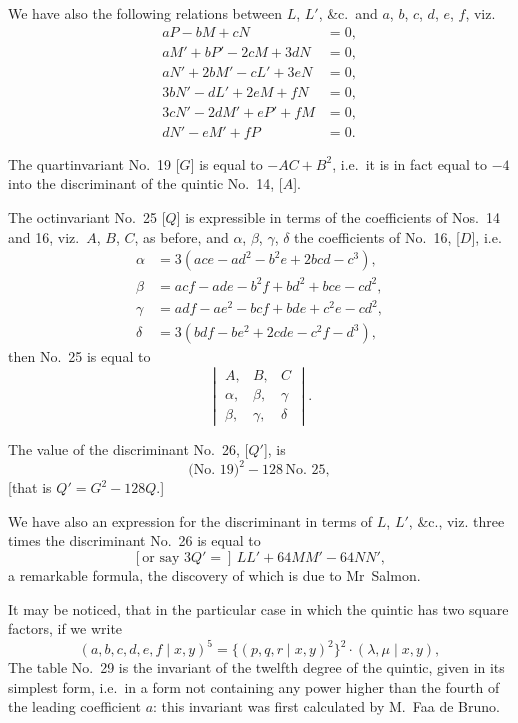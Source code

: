 \documentclass[11pt,a4paper]{book}
\begin{document}
\begin{center}
\clearpage
We have also the following relations between $L$, $L'$, \&c.\ and $a$, $b$, $c$, $d$, $e$, $f$,
viz.
\begin{align*}
aP - bM + cN &= 0,\\
aM' + bP' - 2cM + 3dN &= 0,\\
aN' + 2bM' - cL' + 3eN &= 0,\\
3bN' - dL' + 2eM + fN &= 0,\\
3cN' - 2dM' + eP' + fM &= 0,\\
dN' - eM' + fP &= 0.
\end{align*}

The quartinvariant No.~19 [$G$] is equal to $-AC + B^2$,
i.e.\ it is in fact equal to $-4$ into the discriminant of the quintic No.~14, [$A$].

The octinvariant No.~25 [$Q$] is expressible in terms of the coefficients of Nos.~14 and 16,
viz.\ $A$, $B$, $C$, as before, and $\alpha$, $\beta$, $\gamma$, $\delta$ the coefficients of No.~16, [$D$],
i.e.
\begin{align*}
\alpha &= 3(ace - ad^2 - b^2e + 2bcd - c^3),\\
\beta &= acf - ade - b^2f + bd^2 + bce - cd^2,\\
\gamma &= adf - ae^2 - bcf + bde + c^2e - cd^2,\\
\delta &= 3(bdf - be^2 + 2cde - c^2f - d^3),
\end{align*}
then No.~25 is equal to
\[
\begin{vmatrix}
A, & B, & C \\
\alpha, & \beta, & \gamma \\
\beta, & \gamma, & \delta
\end{vmatrix}
.\]

The value of the discriminant No.~26, [$Q'$], is
\[\text{(No.~19)}^2 - 128\,\text{No.~25},\]
[that is $Q' = G^2 - 128Q$.]

We have also an expression for the discriminant in terms of $L$, $L'$, \&c., viz.
three times the discriminant No.~26 is equal to
\[[\text{or say }3Q' =]\, LL' + 64MM' - 64NN',\]
a remarkable formula, the discovery of which is due to Mr~Salmon.

It may be noticed, that in the particular case in which the quintic has two square
factors, if we write
\[(a, b, c, d, e, f \mid x, y)^5 = \{(p, q, r \mid x, y)^2\}^2 \cdot (\lambda, \mu \mid x, y),\]
\clearpage
The table No.~29 is the invariant of the twelfth degree of the quintic,
given in its simplest form, i.e.\ in a form not containing any power higher than
the fourth of the leading coefficient $a$: this invariant was first calculated by M.~Faa de Bruno.


\end{center}
\end{document}
